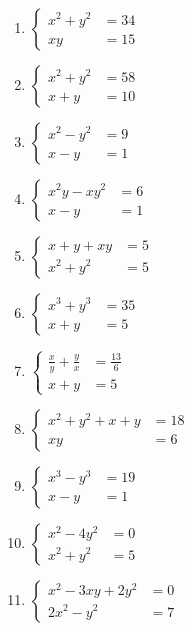 \documentclass[11pt,a4paper]{scrartcl}
\begin{document}
\begin{enumerate}
    \item $\left\{\begin{aligned} x^2+y^2&=34 \\ xy&=15 \end{aligned}\right.$
    \item $\left\{\begin{aligned} x^2+y^2&=58 \\ x+y&=10 \end{aligned}\right.$
    \item $\left\{\begin{aligned} x^2-y^2&=9 \\ x-y&=1 \end{aligned}\right.$
    \item $\left\{\begin{aligned} x^2y - xy^2&=6 \\ x-y&=1 \end{aligned}\right.$
    \item $\left\{\begin{aligned} x+y+xy&=5 \\ x^2+y^2&=5 \end{aligned}\right.$
    \item $\left\{\begin{aligned} x^3+y^3&=35 \\ x+y&=5 \end{aligned}\right.$
    \item $\left\{\begin{aligned} \frac{x}{y} + \frac{y}{x} &= \frac{13}{6} \\ x+y&=5 \end{aligned}\right.$
    \item $\left\{\begin{aligned} x^2+y^2+x+y&=18 \\ xy&=6 \end{aligned}\right.$
    \item $\left\{\begin{aligned} x^3-y^3&=19 \\ x-y&=1 \end{aligned}\right.$
    \item $\left\{\begin{aligned} x^2-4y^2&=0 \\ x^2+y^2&=5 \end{aligned}\right.$
    \item $\left\{\begin{aligned} x^2-3xy+2y^2&=0 \\ 2x^2-y^2&=7 \end{aligned}\right.$

\end{enumerate}
\end{document}
